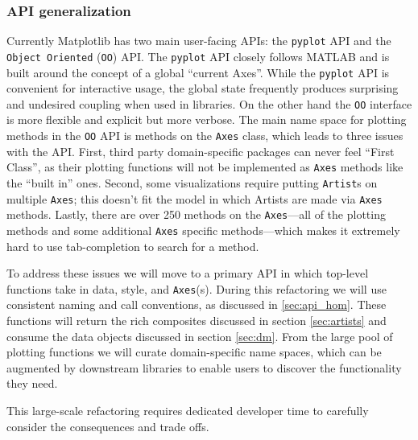 \documentclass[11pt,letterpaper]{article}  %
\begin{document}
\subsubsection{API generalization}
\label{sec:api_gen}
Currently Matplotlib has two main user-facing APIs: the
\texttt{pyplot} API and the \texttt{Object Oriented} (\texttt{OO})
API.  The \texttt{pyplot} API closely follows MATLAB and is built
around the concept of a global ``current Axes''.
While the
\texttt{pyplot} API is convenient for interactive usage, the global
state frequently produces surprising and undesired coupling when used
in libraries.
On the other hand the \texttt{OO} interface is more flexible and
explicit but more verbose.
The main name space for plotting methods in the \texttt{OO} API is
methods on the \texttt{Axes} class, which leads to three issues with
the API.
First, third party domain-specific packages can never feel ``First
Class'', as their plotting functions will not be implemented as
\texttt{Axes} methods like the ``built in'' ones.
Second, some visualizations require putting \texttt{Artist}s on
multiple \texttt{Axes}; this doesn't fit the model in which Artists
are made via \texttt{Axes} methods.
Lastly, there are over 250 methods on the \texttt{Axes}---all of the
plotting methods and some additional \texttt{Axes} specific
methods---which makes it extremely hard to use tab-completion to
search for a method.

To address these issues we will move to a primary API in which
top-level functions take in data, style, and \texttt{Axes}(s).  During
this refactoring we will use consistent naming and call conventions,
as discussed in \ref{sec:api_hom}.
These functions will return the rich composites discussed in section
\ref{sec:artists} and consume the data objects discussed in section
\ref{sec:dm}.  From the large pool of plotting functions we will
curate domain-specific name spaces, which can be augmented by
downstream libraries to enable users to discover the functionality
they need.

This large-scale refactoring requires dedicated developer
time to carefully consider the consequences and trade offs.

\end{document}
